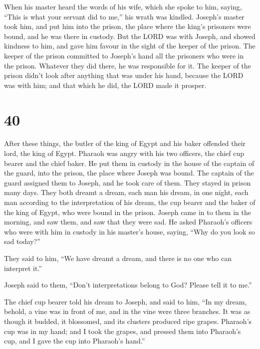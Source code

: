 When his master heard the words of his wife, which she
spoke to him, saying, ``This is what your servant did to me,'' his wrath
was kindled.  Joseph's master took him, and put him into
the prison, the place where the king's prisoners were bound, and he was
there in custody.  But the LORD was with Joseph, and showed
kindness to him, and gave him favour in the sight of the keeper of the
prison.  The keeper of the prison committed to Joseph's
hand all the prisoners who were in the prison. Whatever they did there,
he was responsible for it.  The keeper of the prison didn't
look after anything that was under his hand, because the LORD was with
him; and that which he did, the LORD made it prosper.

\hypertarget{section-39}{%
\section{40}\label{section-39}}

 After these things, the butler of the king of Egypt and his
baker offended their lord, the king of Egypt.  Pharaoh was
angry with his two officers, the chief cup bearer and the chief baker.
 He put them in custody in the house of the captain of the
guard, into the prison, the place where Joseph was bound. 
The captain of the guard assigned them to Joseph, and he took care of
them. They stayed in prison many days.  They both dreamt a
dream, each man his dream, in one night, each man according to the
interpretation of his dream, the cup bearer and the baker of the king of
Egypt, who were bound in the prison.  Joseph came in to them
in the morning, and saw them, and saw that they were sad. 
He asked Pharaoh's officers who were with him in custody in his master's
house, saying, ``Why do you look so sad today?''

 They said to him, ``We have dreamt a dream, and there is no
one who can interpret it.''

Joseph said to them, ``Don't interpretations belong to God? Please tell
it to me.''

 The chief cup bearer told his dream to Joseph, and said to
him, ``In my dream, behold, a vine was in front of me,  and
in the vine were three branches. It was as though it budded, it
blossomed, and its clusters produced ripe grapes. 
Pharaoh's cup was in my hand; and I took the grapes, and pressed them
into Pharaoh's cup, and I gave the cup into Pharaoh's hand.''

